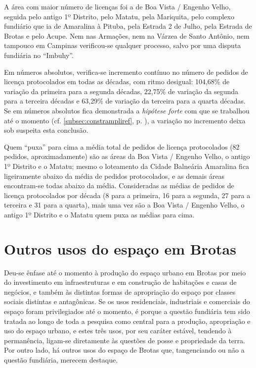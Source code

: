 

A área com maior número de licenças foi a de Boa Vista / Engenho Velho, seguida pelo antigo 1º Distrito, pelo Matatu, pela Mariquita, pelo complexo fundiário que ia de Amaralina à Pituba, pela Estrada 2 de Julho, pela Estrada de Brotas e pelo Acupe. Nem nas Armações, nem na Várzea de Santo Antônio, nem tampouco em Campinas verificou-se qualquer processo, salvo por uma disputa fundiária no ``Imbuhy''.

Em números absolutos, verifica-se incremento contínuo no número de pedidos de licença protocolados em todas as décadas, com ritmo desigual: 104,68\% de variação da primeira para a segunda décadas, 22,75\% de variação da segunda para a terceira décadas e 63,29\% de variação da terceira para a quarta décadas. Se em números absolutos fica demonstrada a \textit{hipótese forte} com que se trabalhou até o momento (cf. \autoref{subsec:constrampliref}, p. \pageref{subsec:constrampliref}), a variação no incremento deixa sob suspeita esta conclusão.

Quem ``puxa'' para cima a média total de pedidos de licença protocolados (82 pedidos, aproximadamente) são as áreas da Boa Vista / Engenho Velho, o antigo 1º Distrito e o Matatu; mesmo o loteamento da Cidade Balneária Amaralina fica ligeiramente abaixo da média de pedidos protocolados, e as demais áreas encontram-se todas abaixo da média. Consideradas as médias de pedidos de licença protocolados por década (8 para a primeira, 16 para a segunda, 27 para a terceira e 31 para a quarta), mais uma vez são a Boa Vista / Engenho Velho, o antigo 1º Distrito e o Matatu quem puxa as médias para cima.

\section{Outros usos do espaço em Brotas}

Deu-se ênfase até o momento à produção do espaço urbano em Brotas por meio do investimento em infraestruturas e em construção de habitações e casas de negócios, e também às distintas formas de apropriação do espaço por classes sociais distintas e antagônicas. Se os usos residenciais, industriais e comerciais do espaço foram privilegiados até o momento, é porque a questão fundiária tem sido tratada ao longo de toda a pesquisa como central para a produção, apropriação e uso do espaço urbano, e estes três usos, por seu caráter estável, tendendo à permanência, ligam-se diretamente às questões de posse e propriedade da terra. Por outro lado, há outros usos do espaço de Brotas que, tangenciando ou não a questão fundiária, merecem destaque.

